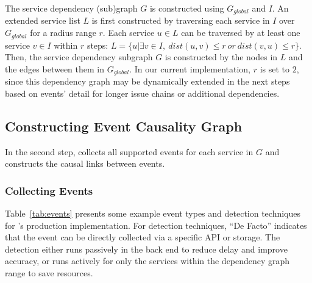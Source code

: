 The service dependency (sub)graph $G$ is constructed using $G_{global}$ and $I$. An extended service list $L$ is first constructed by traversing each service in $I$ over $G_{global}$ for a radius range $r$. Each service $u \in L$ can be traversed by at least one service $v \in I$ within $r$ steps: $L=\{u|\exists v\in I, \ dist(u,v)\le r\ or\ dist(v,u)\le r\}$. Then, the service dependency subgraph $G$ is constructed by the nodes in $L$ and the edges between them in $G_{global}$. In our current implementation, $r$ is set to $2$, since this dependency graph may be dynamically extended in the next steps based on events' detail for longer issue chains or additional dependencies.

\subsection{Constructing Event Causality Graph}
\label{sec:causality}

In the second step, \system collects all supported events for each service in $G$ and constructs the causal links between events. 

\subsubsection{Collecting Events}

Table~\ref{tab:events} presents some example event types and detection techniques for \system's production implementation. For detection techniques, ``De Facto'' indicates that the event can be directly collected via a specific API or storage. %
The detection either runs passively in the back end to reduce delay and improve accuracy, or runs actively for only the services within the dependency graph range to save resources. %


